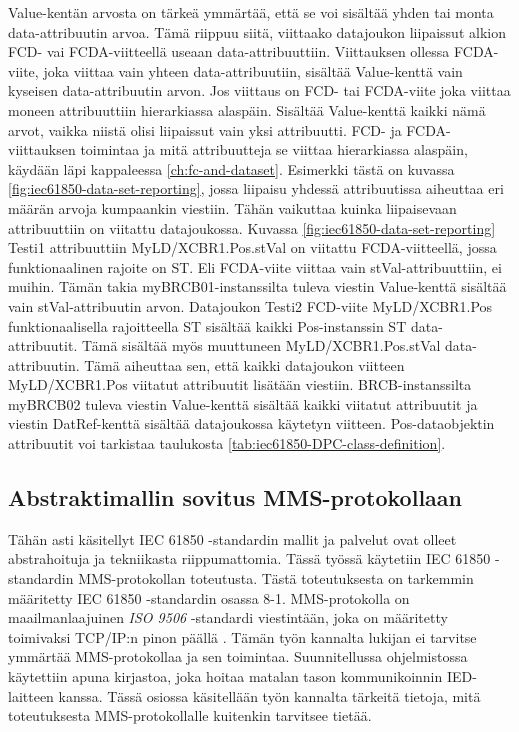 Value-kentän arvosta on tärkeä ymmärtää, että se voi sisältää yhden tai monta data-att\-ri\-buu\-tin arvoa. Tämä riippuu siitä, viittaako datajoukon liipaissut alkion FCD- vai FCDA-viitteellä useaan data-attribuuttiin. Viittauksen ollessa FCDA-viite, joka viittaa vain yhteen data-attribuutiin, sisältää Value-kenttä vain kyseisen data-attribuutin arvon. Jos viittaus on FCD- tai FCDA-viite joka viittaa moneen attribuuttiin hierarkiassa alaspäin. Sisältää Value-kenttä kaikki nämä arvot, vaikka niistä olisi liipaissut vain yksi attribuutti. FCD- ja FCDA-viittauksen toimintaa ja mitä attribuutteja se viittaa hierarkiassa alaspäin, käydään läpi kappaleessa \ref{ch:fc-and-dataset}. Esimerkki tästä on kuvassa \ref{fig:iec61850-data-set-reporting}, jossa liipaisu yhdessä attribuutissa aiheuttaa eri määrän arvoja kumpaankin viestiin. Tähän vaikuttaa kuinka liipaisevaan attribuuttiin on viitattu datajoukossa. Kuvassa \ref{fig:iec61850-data-set-reporting} Testi1 attribuuttiin My\-LD\-/\-XCBR1\-.\-Pos\-.\-st\-Val on viitattu FCDA-viitteellä, jossa funktionaalinen rajoite on ST. Eli FCDA-viite viittaa vain stVal-attribuuttiin, ei muihin. Tämän takia myBRCB01-instanssilta tuleva viestin Value-kenttä sisältää vain stVal-attribuutin arvon. Datajoukon Testi2 FCD-viite My\-LD\-/\-XCBR1\-.\-Pos funktionaalisella rajoitteella ST sisältää kaikki Pos-instanssin ST data-attribuutit. Tämä sisältää myös muuttuneen MyLD/XCBR1.Pos.stVal data-attribuutin. Tämä aiheuttaa sen, että kaikki datajoukon viitteen My\-LD\-/\-XCBR1\-.\-Pos viitatut attribuutit lisätään viestiin. BRCB-instanssilta myBRCB02 tuleva viestin Value-kenttä sisältää kaikki viitatut attribuutit ja viestin DatRef-kenttä sisältää datajoukossa käytetyn viitteen. Pos-dataobjektin attribuutit voi tarkistaa taulukosta \ref{tab:iec61850-DPC-class-definition}. \mbox{\cite[s.~40--44]{IEC61850-7-1}} \mbox{\cite[s.~108]{IEC61850-7-2}}


\subsection{Abstraktimallin sovitus MMS-protokollaan}
\label{ch:iec61850-mms-mallinnus}
Tähän asti käsitellyt IEC 61850 -standardin mallit ja palvelut ovat olleet abstrahoituja ja tekniikasta riippumattomia. Tässä työssä käytetiin IEC 61850 -standardin MMS-protokollan toteutusta. Tästä toteutuksesta on tarkemmin määritetty IEC 61850 -stan\-dar\-din osassa 8-1. MMS-protokolla on maailmanlaajuinen \emph{ISO 9506} -standardi viestintään, joka on määritetty toimivaksi TCP/IP:n pinon päällä \mbox{\cite{MMS-protocol-stack-and-API}}. Tämän työn kannalta lukijan ei tarvitse ymmärtää MMS-protokollaa ja sen toimintaa. Suunnitellussa ohjelmistossa käytettiin apuna kirjastoa, joka hoitaa matalan tason kommunikoinnin IED-laitteen kanssa. Tässä osiossa käsitellään työn kannalta tärkeitä tietoja, mitä toteutuksesta MMS-protokollalle kuitenkin tarvitsee tietää. \mbox{\cite{Introduction-to-the-MMS}}

